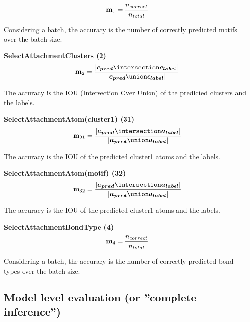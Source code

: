 \documentclass{article}
\begin{document}
\begin{description}

\item[\textbf{SelectMotifMlp (1)}]
\begin{equation}
    \mathbf{m}_1 = \frac{n_{correct}}{n_{total}}
\end{equation}

Considering a batch, the accuracy is the number of correctly predicted motifs over the batch size.

\item{\textbf{SelectAttachmentClusters (2)}}
\begin{equation}
    \m_2 =
    \frac{|\boldsymbol{c_{pred}} \intersection \boldsymbol{c_{label}}|}
    {|\boldsymbol{c_{pred}} \union \boldsymbol{c_{label}}|}
\end{equation}

The accuracy is the IOU (Intersection Over Union) of the predicted clusters and the labels.

\item{\textbf{SelectAttachmentAtom(cluster1) (31)}}
\begin{equation}
    \m_{31} =
    \frac{|\boldsymbol{a_{pred}} \intersection \boldsymbol{a_{label}}|}
    {|\boldsymbol{a_{pred}} \union \boldsymbol{a_{label}}|}
\end{equation}

The accuracy is the IOU of the predicted cluster1 atoms and the labels.

\item{\textbf{SelectAttachmentAtom(motif) (32)}}
\begin{equation}
    \m_{32} =
    \frac{|\boldsymbol{a_{pred}} \intersection \boldsymbol{a_{label}}|}
    {|\boldsymbol{a_{pred}} \union \boldsymbol{a_{label}}|}
\end{equation}

The accuracy is the IOU of the predicted cluster1 atoms and the labels.

\item{\textbf{SelectAttachmentBondType (4)}}
\begin{equation}
    \mathbf{m}_4 = \frac{n_{correct}}{n_{total}}
\end{equation}

Considering a batch, the accuracy is the number of correctly predicted bond types over the batch size.

\end{description}

\subsection{Model level evaluation (or ''complete inference'')}
\end{document}
